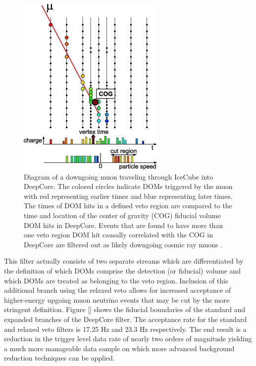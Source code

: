 \documentclass{gatech-thesis}
\begin{document}
\begin{figure}[ht]
  \begin{center}
    \includegraphics[width=.5\textwidth,keepaspectratio]{DeepCoreVeto.jpg}
  \end{center}
  \caption{Diagram of a downgoing muon traveling through IceCube into DeepCore. The colored circles indicate DOMs triggered by the muon with red representing earlier times and blue representing later times. The times of DOM hits in a defined veto region are compared to the time and location of the center of gravity (COG) fiducial volume DOM hits in DeepCore. Events that are found to have more than one veto region DOM hit causally correlated with the COG in DeepCore are filtered out as likely downgoing cosmic ray muons \cite{2012APh....35..615A}.}
  \label{fig:DCVetoSketch}
\end{figure}

This filter actually consists of two separate streams which are differentiated by the definition of which DOMs comprise the detection (or fiducial) volume and which DOMs are treated as belonging to the veto region. Inclusion of this additional branch using the relaxed veto allows for increased acceptance of higher-energy upgoing muon neutrino events that may be cut by the more stringent definition. Figure \ref{} shows the fiducial boundaries of the standard and expanded branches of the DeepCore filter. The acceptance rate for the standard and relaxed veto filters is 17.25 Hz and 23.3 Hz respectively. The end result is a reduction in the trigger level data rate of nearly two orders of magnitude yielding a much more manageable data sample on which more advanced background reduction techniques can be applied.

\end{document}
